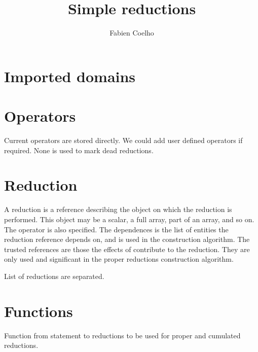 \documentclass{article}
\title{Simple reductions}
\author{Fabien Coelho}
\begin{document}
\maketitle

\section{Imported domains}
\label{sec:import}


\section{Operators}
\label{sec:operators}

Current operators are stored directly.
We could add user defined operators if required.
None is used to mark dead reductions. 



\section{Reduction}
\label{sec:reduction}

A reduction is a reference describing the object on which the reduction is
performed. This object may be a scalar, a full array, part of an array,
and so on. The operator is also specified. The dependences is the list of
entities the reduction reference depends on, and is used in the
construction algorithm. The trusted references are those the effects of
contribute to the reduction. They are only used and significant in the
proper reductions construction algorithm.



List of reductions are separated.



\section{Functions}
\label{sec:functions}

Function from statement to reductions to be used for proper and cumulated
reductions. 

\end{document}
